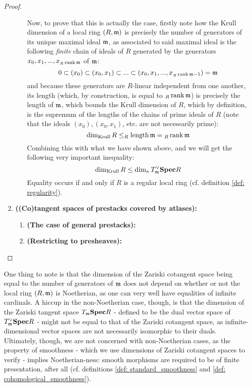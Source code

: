 \begin{proof}
\begin{enumerate}
\begin{enumerate}
                                Now, to prove that this is actually the case, firstly note how the Krull dimension of a local ring $(R, \mathfrak{m})$ is precisely the number of generators of its unique maximal ideal $\mathfrak{m}$, as associated to said maximal ideal is the following \textit{finite} chain of ideals of $R$ generated by the generators $x_0, x_1, ..., x_{{}_R\operatorname{rank} \mathfrak{m}}$ of $\mathfrak{m}$:
                                    $$0 \subset (x_0) \subset (x_0, x_1) \subset ... \subset (x_0, x_1, ..., x_{{}_R\operatorname{rank} \mathfrak{m} - 1}) = \mathfrak{m}$$
                                and because these generators are $R$-linear independent from one another, its length (which, by construction, is equal to ${}_R\operatorname{rank} \mathfrak{m}$) is precisely the length of $\mathfrak{m}$, which bounds the Krull dimension of $R$, which by definition, is the supremum of the lengths of the chains of prime ideals of $R$ (note that the ideals $(x_0), (x_0, x_1)$, etc. are not necessarily prime):
                                    $$\dim_{\mathrm{Krull}} R \leq _R\operatorname{length} \mathfrak{m} = {}_R\operatorname{rank} \mathfrak{m}$$
                                Combining this with what we have shown above, and we will get the following very important inequality:
                                    $$\dim_{\mathrm{Krull}} R \leq \dim_{\kappa} T^{\vee}_{\mathfrak{m}} \mathbf{Spec} R$$
                                Equality occurs if and only if $R$ is a regular local ring (cf. definition \ref{def: regularity}).
                            \end{enumerate}
                        \item \textbf{\textbf{((Co)tangent spaces of prestacks covered by atlases):}} 
                            \begin{enumerate}
                                \item \textbf{(The case of general prestacks):}
                                \item \textbf{(Restricting to presheaves):}
                            \end{enumerate}
                    \end{enumerate}
                \end{proof}
            \begin{remark}
                One thing to note is that the dimension of the Zariski cotangent space being equal to the number of generators of $\mathfrak{m}$ does not depend on whether or not the local ring $(R, \mathfrak{m})$ is Noetherian, as one can very well have equalities of infinite cardinals. A hiccup in the non-Noetherian case, though, is that the dimension of the Zariski tangent space $T_{\mathfrak{m}}\mathbf{Spec} R$ - defined to be the dual vector space of $T^{\vee}_{\mathfrak{m}}\mathbf{Spec} R$ - might not be equal to that of the Zariski cotangent space, as infinite-dimensional vector spaces are not necessarily isomorphic to their duals. Ultimately, though, we are not concerned with non-Noetherian cases, as the property of smoothness - which we use dimensions of Zariski cotangent spaces to verify - implies Noetherian-ness: smooth morphisms are required to be of finite presentation, after all (cf. definitions \ref{def: standard_smoothness} and \ref{def: cohomological_smoothness}).
            \end{remark}
                
